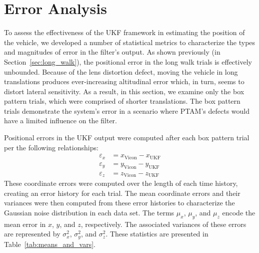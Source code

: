 \section{Error Analysis}

To assess the effectiveness of the UKF framework in estimating the position of the vehicle, we developed a number of statistical metrics to characterize the types and magnitudes of error in the filter's output. As shown previously (in Section~\ref{sec:long_walk}), the positional error in the long walk trials is effectively unbounded. Because of the lens distortion defect, moving the vehicle in long translations produces ever-increasing altitudinal error which, in turn, seems to distort lateral sensitivity. As a result, in this section, we examine only the box pattern trials, which were comprised of shorter translations. The box pattern trials demonstrate the system's error in a scenario where PTAM's defects would have a limited influence on the filter.

Positional errors in the UKF output were computed after each box pattern trial per the following relationships:
%
\begin{align}
\varepsilon_{x} &= x_{\text{Vicon}} - x_{\text{UKF}} \\
\varepsilon_{y} &= y_{\text{Vicon}} - y_{\text{UKF}} \\
\varepsilon_{z} &= z_{\text{Vicon}} - z_{\text{UKF}}
\end{align}
%
These coordinate errors were computed over the length of each time history, creating an error history for each trial. The mean coordinate errors and their variances were then computed from these error histories to characterize the Gaussian noise distribution in each data set. The terms $\mu_{x}$, $\mu_{y}$, and $\mu_{z}$ encode the mean error in $x$, $y$, and $z$, respectively. The associated variances of these errors are represented by $\sigma_{x}^{2}$, $\sigma_{y}^{2}$, and $\sigma_{z}^{2}$. These statistics are presented in Table~\ref{tab:means_and_vars}.

